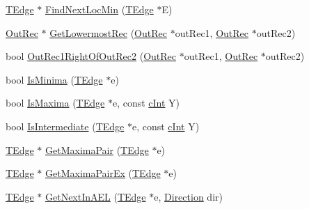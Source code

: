\begin{DoxyCompactItemize}
\mbox{\hyperlink{struct_clipper_lib_1_1_t_edge}{T\+Edge}} $\ast$ \mbox{\hyperlink{namespace_clipper_lib_a2e62d7a90f565dceab371c8ed250131e}{Find\+Next\+Loc\+Min}} (\mbox{\hyperlink{struct_clipper_lib_1_1_t_edge}{T\+Edge}} $\ast$E)
\item 
\mbox{\hyperlink{struct_clipper_lib_1_1_out_rec}{Out\+Rec}} $\ast$ \mbox{\hyperlink{namespace_clipper_lib_a4460fbf56cbd0c6b6928867a189b9c91}{Get\+Lowermost\+Rec}} (\mbox{\hyperlink{struct_clipper_lib_1_1_out_rec}{Out\+Rec}} $\ast$out\+Rec1, \mbox{\hyperlink{struct_clipper_lib_1_1_out_rec}{Out\+Rec}} $\ast$out\+Rec2)
\item 
bool \mbox{\hyperlink{namespace_clipper_lib_ab7e60ff44337799046ac87d22986da2b}{Out\+Rec1\+Right\+Of\+Out\+Rec2}} (\mbox{\hyperlink{struct_clipper_lib_1_1_out_rec}{Out\+Rec}} $\ast$out\+Rec1, \mbox{\hyperlink{struct_clipper_lib_1_1_out_rec}{Out\+Rec}} $\ast$out\+Rec2)
\item 
bool \mbox{\hyperlink{namespace_clipper_lib_adebe3bd08021b5329adfc84089913b32}{Is\+Minima}} (\mbox{\hyperlink{struct_clipper_lib_1_1_t_edge}{T\+Edge}} $\ast$e)
\item 
bool \mbox{\hyperlink{namespace_clipper_lib_a7a9e26585f642573f49208a47dc458c3}{Is\+Maxima}} (\mbox{\hyperlink{struct_clipper_lib_1_1_t_edge}{T\+Edge}} $\ast$e, const \mbox{\hyperlink{namespace_clipper_lib_a7156730a24951629192d4831334bafaa}{c\+Int}} Y)
\item 
bool \mbox{\hyperlink{namespace_clipper_lib_af6efe5b4046206e5c152374d384384c1}{Is\+Intermediate}} (\mbox{\hyperlink{struct_clipper_lib_1_1_t_edge}{T\+Edge}} $\ast$e, const \mbox{\hyperlink{namespace_clipper_lib_a7156730a24951629192d4831334bafaa}{c\+Int}} Y)
\item 
\mbox{\hyperlink{struct_clipper_lib_1_1_t_edge}{T\+Edge}} $\ast$ \mbox{\hyperlink{namespace_clipper_lib_ab04424175ecd1d0e89628e0837e70e8d}{Get\+Maxima\+Pair}} (\mbox{\hyperlink{struct_clipper_lib_1_1_t_edge}{T\+Edge}} $\ast$e)
\item 
\mbox{\hyperlink{struct_clipper_lib_1_1_t_edge}{T\+Edge}} $\ast$ \mbox{\hyperlink{namespace_clipper_lib_aa71581201c285fa900577b2d5b73e9c7}{Get\+Maxima\+Pair\+Ex}} (\mbox{\hyperlink{struct_clipper_lib_1_1_t_edge}{T\+Edge}} $\ast$e)
\item 
\mbox{\hyperlink{struct_clipper_lib_1_1_t_edge}{T\+Edge}} $\ast$ \mbox{\hyperlink{namespace_clipper_lib_a151a08d2bb95f884d30d2cdbb68b14c2}{Get\+Next\+In\+A\+EL}} (\mbox{\hyperlink{struct_clipper_lib_1_1_t_edge}{T\+Edge}} $\ast$e, \mbox{\hyperlink{namespace_clipper_lib_a50027cc5a43f727ff89bcadf7e4524a7}{Direction}} dir)

\end{DoxyCompactItemize}
